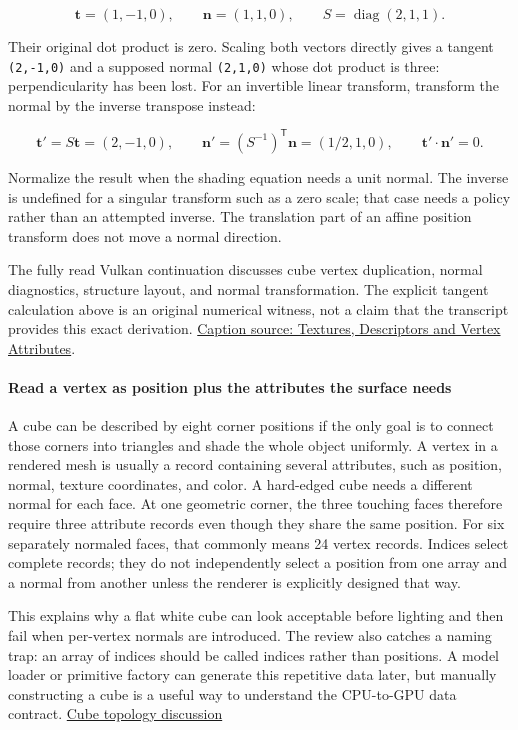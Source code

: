 \[
\mathbf{t}=(1,-1,0),\qquad \mathbf{n}=(1,1,0),\qquad S=\operatorname{diag}(2,1,1).
\]

Their original dot product is zero. Scaling both vectors directly gives a tangent \texttt{(2,-1,0)} and a supposed normal \texttt{(2,1,0)} whose dot product is three: perpendicularity has been lost. For an invertible linear transform, transform the normal by the inverse transpose instead:

\[
\mathbf{t}'=S\mathbf{t}=(2,-1,0),\qquad
\mathbf{n}'=(S^{-1})^{\mathsf T}\mathbf{n}=(1/2,1,0),\qquad
\mathbf{t}'\cdot\mathbf{n}'=0.
\]

Normalize the result when the shading equation needs a unit normal. The inverse is undefined for a singular transform such as a zero scale; that case needs a policy rather than an attempted inverse. The translation part of an affine position transform does not move a normal direction.

The fully read Vulkan continuation discusses cube vertex duplication, normal diagnostics, structure layout, and normal transformation. The explicit tangent calculation above is an original numerical witness, not a claim that the transcript provides this exact derivation. \href{https://www.youtube.com/watch?v=QFf91u8bZlk}{Caption source: Textures, Descriptors and Vertex Attributes}.

\paragraph{Read a vertex as position plus the attributes the surface needs}\label{06-engine-ii-ch025-read-a-vertex-as-position-plus-the-attributes-the-surface-needs}

A cube can be described by eight corner positions if the only goal is to connect those corners into triangles and shade the whole object uniformly. A vertex in a rendered mesh is usually a record containing several attributes, such as position, normal, texture coordinates, and color. A hard-edged cube needs a different normal for each face. At one geometric corner, the three touching faces therefore require three attribute records even though they share the same position. For six separately normaled faces, that commonly means 24 vertex records. Indices select complete records; they do not independently select a position from one array and a normal from another unless the renderer is explicitly designed that way.

This explains why a flat white cube can look acceptable before lighting and then fail when per-vertex normals are introduced. The review also catches a naming trap: an array of indices should be called indices rather than positions. A model loader or primitive factory can generate this repetitive data later, but manually constructing a cube is a useful way to understand the CPU-to-GPU data contract. \href{https://www.youtube.com/watch?v=sIAXLH7ZqCw&t=13m50s}{Cube topology discussion}

